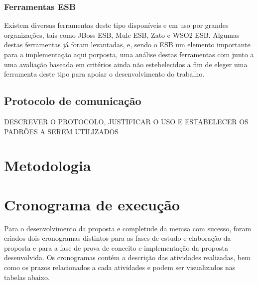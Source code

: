 \subsubsection{Ferramentas ESB}
Existem diversas ferramentas deste tipo disponíveis e em uso por grandes organizações, tais como JBoss ESB, Mule ESB, Zato e WSO2 ESB. Algumas destas ferramentas já foram levantadas, e, sendo o ESB um elemento importante para a implementação aqui porposta, uma análise destas ferramentas com junto a uma avaliação baseada em critérios ainda não estebelecidos a fim de eleger uma ferramenta deste tipo para apoiar o desenvolvimento do trabalho.

\subsection{Protocolo de comunicação}

{DESCREVER O PROTOCOLO, JUSTIFICAR O USO E ESTABELECER OS PADRÕES A SEREM UTILIZADOS}

\section{Metodologia}


\section{Cronograma de execução}
Para o desenvolvimento da proposta e completude da memsa com sucesso, foram criados dois cronogramas distintos para as fases de estudo e elaboração da proposta e para a fase de prova de conceito e implementação da proposta desenvolvida. Os cronogramas contém a descrição das atividades realizadas, bem como os prazos relacionados a cada atividades e podem ser visualizados nas tabelas abaixo.

